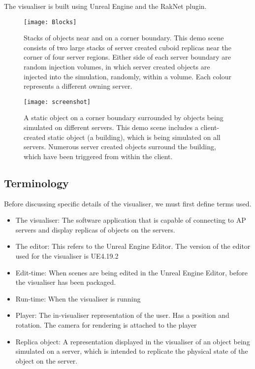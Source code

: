 The visualiser is built using Unreal Engine and the RakNet plugin.

\begin{figure}[!t]
	\centering
	\texttt{[image: Blocks]}
	\caption{Stacks of objects near and on a corner boundary. This demo scene consists of two large stacks of server created cuboid replicas near the corner of four server regions. Either side of each server boundary are random injection volumes, in which server created objects are injected into the simulation, randomly, within a volume. Each colour represents a different owning server.}
	\label{fig_screen1}
\end{figure}

\begin{figure}[!t]
	\centering
	\texttt{[image: screenshot]}
	\caption{A static object on a corner boundary surrounded by objects being simulated on different servers. This demo scene includes a client-created static object (a building), which is being simulated on all servers. Numerous server created objects surround the building, which have been triggered from within the client.}
	\label{fig_screen2}
\end{figure}

\subsection{Terminology}
Before discussing specific details of the visualiser, we must first define terms used.
\begin{itemize}
	\item The visualiser: The software application that is capable of connecting to AP servers and display replicas of objects on the servers.
	\item The editor: This refers to the Unreal Engine Editor. The version of the editor used for the visualiser is UE4.19.2
	\item Edit-time: When scenes are being edited in the Unreal Engine Editor, before the visualiser has been packaged.
	\item Run-time: When the visualiser is running
	\item Player: The in-visualiser representation of the user. Has a position and rotation. The camera for rendering is attached to the player
	\item Replica object: A representation displayed in the visualiser of an object being simulated on a server, which is intended to replicate the physical state of the object on the server.
\end{itemize}

